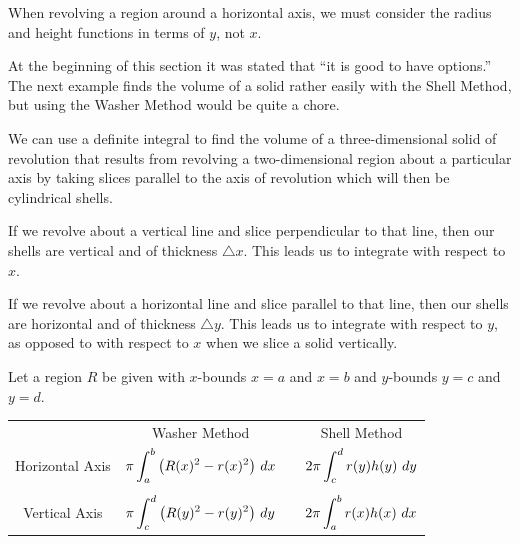 
When revolving a region around a horizontal axis, we must consider the radius and height functions in terms of $y$, not $x$.



At the beginning of this section it was stated that ``it is good to have options.'' The next example finds the volume of a solid rather easily with the Shell Method, but using the Washer Method would be quite a chore.


\begin{summary}
  \item We can use a definite integral to find the volume of a three-dimensional solid of revolution that results from revolving a two-dimensional region about a particular axis by taking  slices parallel to the axis of revolution which will then be cylindrical shells.
  \item If we revolve about a vertical line and slice perpendicular to that line, then our shells are vertical and of thickness $\triangle x$. This leads us to integrate with respect to $x$.
	\item If we revolve about a horizontal line and slice parallel to that line, then our shells are horizontal and of thickness $\triangle y$. This leads us to integrate with respect to $y$, as opposed to with respect to $x$ when we slice a solid vertically.
	\item Let a region $R$ be given with $x$-bounds $x=a$ and $x=b$ and $y$-bounds $y=c$ and $y=d$.
\vskip 5pt
\begin{tabular}{cccc}
 		& Washer Method & & Shell Method \rule[-10pt]{0pt}{10pt} \\
 \parbox{50pt}{\centering Horizontal Axis}  & $\displaystyle \pi\int_a^b \big(R(x)^2-r(x)^2\big)\ dx$ & & $\displaystyle 2\pi\int_c^d r(y)h(y)\ dy$ \\ \\
 \parbox{40pt}{\centering Vertical Axis} &  $\displaystyle\pi \int_c^d\big(R(y)^2-r(y)^2\big)\ dy$ & & $\displaystyle 2\pi\int_a^b r(x)h(x)\ dx$
 \end{tabular}
\end{summary} 

\clearpage

 

\cleardoublepage